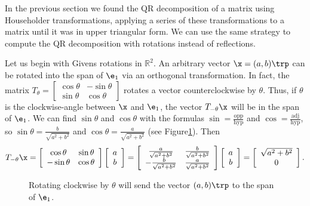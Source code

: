 In the previous section we found the QR decomposition of a matrix using Householder transformations, applying a series of these transformations to a matrix until it was in upper triangular form.
We can use the same strategy to compute the QR decomposition with rotations instead of reflections.

Let us begin with Givens rotations in $\mathbb{R}^2$.
An arbitrary vector $\x = (a, b)\trp$ can be rotated into the span of $\e_1$ via an orthogonal transformation.
In fact, the matrix $T_{\theta} = \left[\begin{array}{cc}\cos \theta & - \sin \theta \\ \sin \theta & \cos \theta \end{array}\right]$ rotates a vector counterclockwise by $\theta$.
Thus, if $\theta$ is the clockwise-angle between $\x$ and $\e_1$, the vector $T_{-\theta}\x$ will be in the span of $\e_1$.
We can find $\sin \theta$ and $\cos \theta$ with the formulas $\sin = \frac{\text{opp}}{\text{hyp}}$ and $\cos = \frac{\text{adj}}{\text{hyp}}$, so $\sin \theta = \frac{b}{\sqrt{a^2+b^2}}$ and $\cos \theta =  \frac{a}{\sqrt{a^2+b^2}}$ (see Figure\ref{fig:angle}).
Then
\[
T_{-\theta}\x
=
\left[\begin{array}{cc}
\cos\theta  & \sin\theta \\
-\sin\theta & \cos\theta \\
\end{array}\right]
\left[\begin{array}{c} a \\ b \end{array}\right]
=
\left[\begin{array}{cc}
 \frac{a}{\sqrt{a^2+b^2}} & \frac{b}{\sqrt{a^2+b^2}} \\
-\frac{b}{\sqrt{a^2+b^2}} & \frac{a}{\sqrt{a^2+b^2}} \\
\end{array}\right]
\left[\begin{array}{c} a \\ b \end{array}\right]
=
\left[\begin{array}{c} \sqrt{a^2+b^2} \\ 0 \end{array}\right].
\]

\begin{figure}
\begin{center}
\caption{Rotating clockwise by $\theta$ will send the vector $(a,b)\trp$ to the span of $\e_1$.}
\label{fig:angle}
\end{center}
\end{figure}

